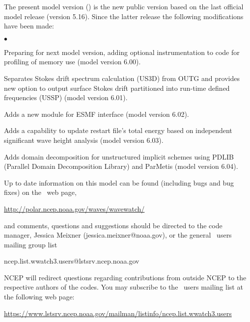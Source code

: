 \vspace{\baselineskip} 
\noindent 
The present model version (\WWver) is the new public version based on the
last official model release (version 5.16). Since the latter release the
following modifications have been made:

\begin{list}{$\bullet$}{\rightmargin 5mm \parsep 0mm \itemsep 0mm}

\item Preparing for next model version, adding optional instrumentation to code
      for profiling of memory use (model version 6.00).

\item Separates Stokes drift spectrum calculation (US3D) from OUTG and provides 
      new option to output surface Stokes drift partitioned into run-time defined 
      frequencies (USSP) (model version 6.01).  

\item Adds a new module for ESMF interface (model version 6.02). 

\item Adds a capability to update restart file's total energy based on independent 
      significant wave height analysis (model version 6.03).

\item Adds domain decomposition for unstructured implicit schemes using PDLIB
       (Parallel Domain Decomposition Library) and ParMetis (model version 6.04).

\end{list}

\vspace{\baselineskip} \noindent 
Up to date information on this model can be found (including bugs and bug
fixes) on the \ws\ web page, 
\begin{center}
\url{http://polar.ncep.noaa.gov/waves/wavewatch/}
\end{center}
and comments, questions and suggestions should be
directed to the code manager, Jessica Meixner (jessica.meixner@noaa.gov), or the general \ws\ users mailing group list

\begin{center}
ncep.list.wwatch3.users@lstsrv.ncep.noaa.gov
\end{center}

\noindent
NCEP will redirect questions regarding contributions from outside NCEP to the
respective authors of the codes. You may subscribe to the \ws\ users 
mailing list at the following web page:
\begin{center}
\footnotesize
\url{https://www.lstsrv.ncep.noaa.gov/mailman/listinfo/ncep.list.wwatch3.users}
\end{center} 


